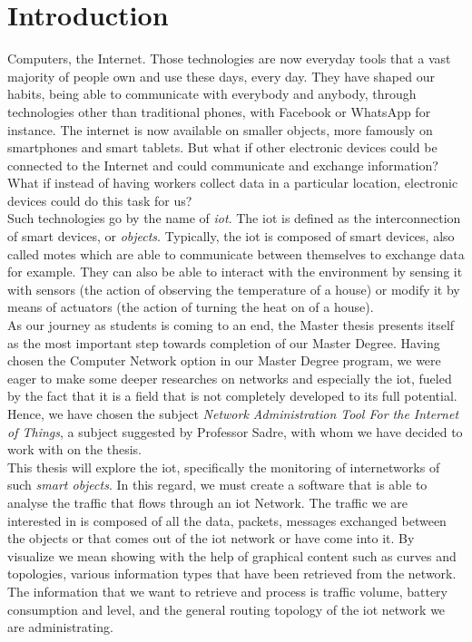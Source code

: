 \chapter*{Introduction}


Computers, the Internet. Those technologies are now everyday tools that a vast majority of people own and use these days, every day. They have shaped our habits, being able to communicate with everybody and anybody, through technologies other than traditional phones, with Facebook or WhatsApp for instance. The internet is now available on smaller objects, more famously on smartphones and smart tablets. But what if other electronic devices could be connected to the Internet and could communicate and exchange information? What if instead of having workers collect data in a particular location, electronic devices could do this task for us?\\

Such technologies go by the name of \textit{\acrlong{iot}}. The \acrfull{iot} is defined as the interconnection of smart devices, or \textit{objects}. Typically, the \acrshort{iot} is composed of smart devices, also called motes which are able to communicate between themselves to exchange data for example. They can also be able to interact with the environment by sensing it with sensors (the action of observing the temperature of a house) or modify it by means of actuators (the action of turning the heat on of a house).\\

As our journey as students is coming to an end, the Master thesis presents itself as the most important step towards completion of our Master Degree.  Having chosen the Computer Network option in our Master Degree program, we were eager to make some deeper researches on networks and especially the \acrshort{iot}, fueled by the fact that it is a field that is not completely developed to its full potential. Hence, we have chosen the subject \textit{Network Administration Tool For the Internet of Things}, a subject suggested by Professor Sadre, with whom we have decided to work with on the thesis. \\

This thesis will explore the \acrlong{iot}, specifically the monitoring of internetworks of such \textit{smart objects}.  In this regard, we must create a software that is able to analyse the traffic that flows through an \acrshort{iot} Network. The traffic we are interested in is composed of all the data, packets, messages exchanged between the objects or that comes out of the \acrshort{iot} network or have come into it. By visualize we mean showing with the help of graphical content such as curves and topologies, various information types that have been retrieved from the network. The information that we want to retrieve and process is traffic volume, battery consumption and level, and the general routing topology of the \acrshort{iot} network we are administrating.

